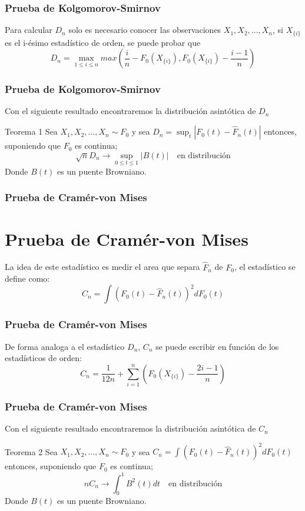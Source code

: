 \documentclass[aspectratio=169,spanish]{beamer}
\begin{document}
\begin{frame}
\frametitle{Prueba de Kolgomorov-Smirnov}
Para calcular $D_n$ solo es necesario conocer las observaciones $X_1,X_2,...,X_n$, si $X_{\{i\}}$ es el i-ésimo estadístico de orden, se puede probar que $$D_n =\max_{1\le i\le n}max(\frac{i}{n}-F_0(X_{\{i\}}),F_0(X_{\{i\}})-\frac{i-1}{n})$$
\end{frame}
\begin{frame}
\frametitle{Prueba de Kolgomorov-Smirnov}
Con el siguiente resultado encontraremos la distribución asintótica de $D_n$
\begin{block}{Teorema 1}
Sea $X_1,X_2,...,X_n\sim F_0$ y sea $D_n=\sup_{t}|F_0(t)-\hat{F}_n(t)|$ entonces, suponiendo que $F_0$ es continua; $$\sqrt{n}D_n \rightarrow \sup_{0\le t\le 1}|B(t)|\quad \text{en distribución}$$
Donde $B(t)$ es un puente Browniano.
\end{block}
\end{frame}


\begin{frame}
\frametitle{Prueba de Cramér-von Mises}
\section{Prueba de Cramér-von Mises}
La idea de este estadístico es medir el area que separa $\hat{F}_n$ de $F_0$, el estadístico se define como:
$$C_n=\int(F_0(t)-\hat{F}_n(t))^2dF_0(t)$$
\end{frame}
\begin{frame}
\frametitle{Prueba de Cramér-von Mises}
De forma analoga a el estadístico $D_n$, $C_n$ se puede escribir en función de los estadísticos de orden: 
$$C_n=\frac{1}{12n}+\sum_{i=1}^{n}\left(F_0(X_{\{i\}})-\frac{2i-1}{n}\right)$$ 
\end{frame}
\begin{frame}
\frametitle{Prueba de Cramér-von Mises}
Con el siguiente resultado encontraremos la distribución asintótica de $C_n$
\begin{block}{Teorema 2}
Sea $X_1,X_2,...,X_n\sim F_0$ y sea $C_n=\int(F_0(t)-\hat{F}_n(t))^2dF_0(t)$ entonces, suponiendo que $F_0$ es continua; $$nC_n \rightarrow \int_0^1B^2(t)dt\quad \text{en distribución}$$
Donde $B(t)$ es un puente Browniano.
\end{block}
\end{frame}
\end{document}
